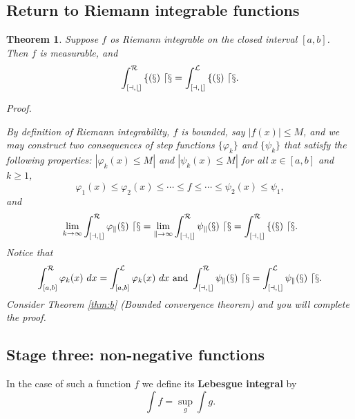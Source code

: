 \documentclass[
]{book}
\newtheorem{theorem}{Theorem}[chapter]
\theoremstyle{definition}
\theoremstyle{definition}
\theoremstyle{definition}
\theoremstyle{definition}
\theoremstyle{remark}
\begin{document}
\subsection{Return to Riemann integrable functions}\label{return-to-riemann-integrable-functions}

\begin{theorem}
\leavevmode

Suppose \(f\) os Riemann integrable on the closed interval \([a,b]\). Then \(f\) is measurable, and
\[
\cal \int_{[a,b]}^Rf(x)\ dx=\int_{[a,b]}^Lf(x)\ dx.
\]

\emph{Proof.}

By definition of Riemann integrability, \(f\) is bounded, say \(|f(x)|\le M\), and we may construct two consequences of step functions \(\{\varphi_k\}\) and \(\{\psi_k\}\) that satisfy the following properties: \(|\varphi_k(x)\le M|\) and \(|\psi_k(x)\le M|\) for all \(x\in[a,b]\) and \(k\ge 1\),
\[
\varphi_1(x)\le \varphi_2(x) \le \cdots\le f\le\cdots\le \psi_2(x)\le \psi_1,
\]
and
\[
\lim_{k\to\infty}\cal \int_{[a,b]}^R\varphi_k(x)\ dx=\lim_{k\to\infty}\cal \int_{[a,b]}^R\psi_k(x)\ dx=\cal \int_{[a,b]}^Rf(x)\ dx.
\]
Notice that
\[
\int_{[a,b]}^\mathcal{R}\varphi_k(x)\ dx=\int_{[a,b]}^\mathcal{L}\varphi_k(x)\ dx \text{ and }\cal \int_{[a,b]}^R\psi_k(x)\ dx=\cal \int_{[a,b]}^L\psi_k(x)\ dx.
\]
Consider Theorem \ref{thm:b} (Bounded convergence theorem) and you will complete the proof.

\end{theorem}

\subsection{Stage three: non-negative functions}\label{stage-three-non-negative-functions}

In the case of such a function \(f\) we define its \textbf{Lebesgue integral} by
\[
\int f =\sup_g\int g.
\]
\end{document}
